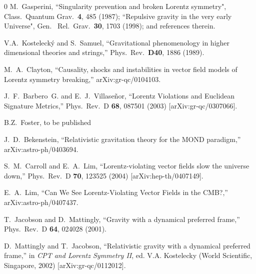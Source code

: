 \documentclass[aps]{ws-procs9x6}
\begin{document}
\begin{thebibliography}{0}
M.~Gasperini,
``Singularity prevention and broken Lorentz symmetry",
Class.\ Quantum Grav.\ {\bf 4}, 485 (1987);
``Repulsive gravity in the very early Universe",
Gen. \ Rel.\ Grav.\ {\bf 30}, 1703 (1998); and
references therein.

V.A.~Kosteleck\'y and S.~Samuel,
``Gravitational phenomenology in higher dimensional theories and
strings,'' Phys.\ Rev.\  {\bf D40}, 1886 (1989).

M.~A.~Clayton,
 ``Causality, shocks and instabilities in vector field models of Lorentz
symmetry breaking,''
arXiv:gr-qc/0104103.

J.~F.~Barbero~G. and E.~J.~Villase\~{n}or,
``Lorentz Violations and Euclidean Signature Metrics,''
Phys.\ Rev.\ D {\bf 68}, 087501 (2003)
[arXiv:gr-qc/0307066].

B.Z.~Foster, to be published

J.~D.~Bekenstein,
``Relativistic gravitation theory for the MOND paradigm,''
arXiv:astro-ph/0403694.

S.~M.~Carroll and E.~A.~Lim,
``Lorentz-violating vector fields slow the universe down,''
Phys.\ Rev.\ D {\bf 70}, 123525 (2004)
[arXiv:hep-th/0407149].

E.~A.~Lim,
``Can We See Lorentz-Violating Vector Fields in the CMB?,''
arXiv:astro-ph/0407437.

T.~Jacobson and D.~Mattingly,
``Gravity with a dynamical preferred frame,''
Phys.\ Rev.\ D {\bf 64}, 024028 (2001).

D.~Mattingly and T.~Jacobson,
``Relativistic gravity with a dynamical preferred frame,''
in {\it CPT and Lorentz
Symmetry II}, ed. V.A. Kostelecky (World Scientific, Singapore,
2002) [arXiv:gr-qc/0112012].


\end{thebibliography}
\end{document}
